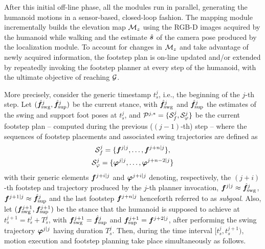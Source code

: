 After this initial off-line phase, all the modules run in parallel, generating
the humanoid motions in a sensor-based, closed-loop fashion.
%
The mapping module incrementally builds the elevation map ${\cal M}_z$ using
the RGB-D images acquired by the humanoid while walking and the estimate
$\hat{{\bm{s}}}$ of the camera pose produced by the localization module.
To account for changes in ${\cal M}_z$ and take advantage of newly acquired
information, the footstep plan is on-line updated and/or extended by repeatedly
invoking the footstep planner at every step of the humanoid, with the ultimate
objective of reaching $\cal G$. 

More precisely, consider the generic timestamp $t_s^j$, i.e., the beginning of
the $j$-th step.
Let $(\hat{{\bm{f}}}_{\rm swg}^{j}, \hat{{\bm{f}}}_{\rm sup}^{j})$ be the current
stance, with $\hat{{\bm{f}}}_{\rm swg}^{j}$ and $\hat{{\bm{f}}}_{\rm sup}^{j}$ the
estimates of the swing and support foot poses at $t_s^j$, and
${\cal P}^{j,*} = \{ {\cal S}_f^{j}, {\cal S}_\varphi^{j} \}$ be the current
footstep plan -- computed during the previous ($(j-1)$-th) step -- where the
sequences of footstep placements and associated swing trajectories are defined
as
\begin{gather*}
    {\cal S}_f^j = \{{\bm{f}}^{j|j}, \dots, {\bm{f}}^{j+n|j}\}, \\
    {\cal S}_\varphi^j = \{{\bm{\varphi}}^{j|j}, \dots, {\bm{\varphi}}^{j+n-2|j}\}
\end{gather*}
with their generic elements ${\bm{f}}^{j+i|j}$ and ${\bm{\varphi}}^{j+i|j}$ denoting,
respectively, the $(j+i)$-th footstep and trajectory produced by the $j$-th
planner invocation, ${\bm{f}}^{j|j} \approx \hat{{\bm{f}}}_{\rm swg}^{j}$,
${\bm{f}}^{j+1|j} \approx \hat{{\bm{f}}}_{\rm sup}^{j}$ and the last footstep
${\bm{f}}^{j+n|j}$ henceforth referred to as \textit{subgoal}.
Also, let $({\bm{f}}_{\rm swg}^{j+1}, {\bm{f}}_{\rm sup}^{j+1})$ be the stance that the
humanoid is supposed to achieve at $t_s^{j+1} = t_s^j + T_s^j$, with
${\bm{f}}_{\rm swg}^{j+1} = \hat{{\bm{f}}}_{\rm sup}^{j}$ and
${\bm{f}}_{\rm sup}^{j+1} = {\bm{f}}^{j+2|j}$, after performing the swing trajectory
${\bm{\varphi}}^{j|j}$ having duration $T_s^j$.
%
Then, during the time interval $[t_s^j, t_s^{j+1})$, motion execution and
footstep planning take place simultaneously as follows.
